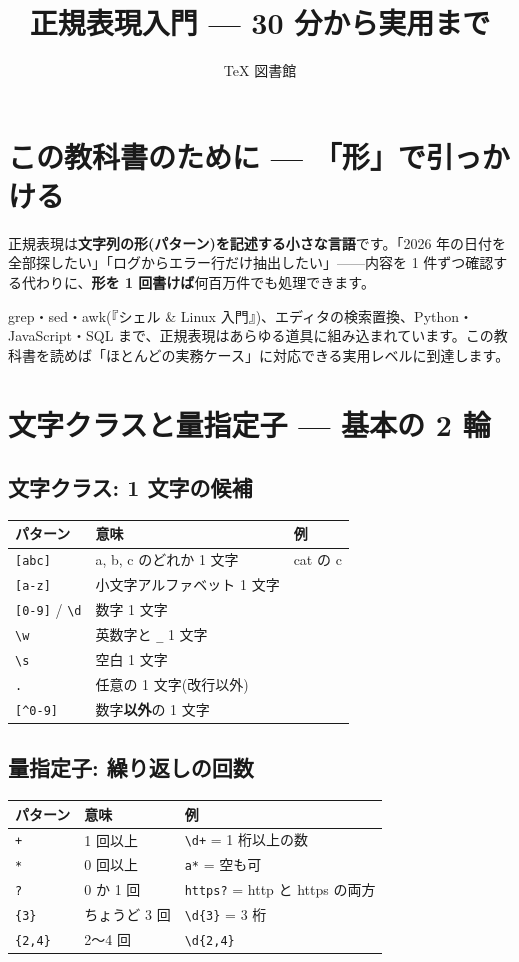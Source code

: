 \documentclass{article}
\title{正規表現入門 — 30 分から実用まで}
\author{TeX 図書館}
\begin{document}
\section{この教科書のために — 「形」で引っかける}

正規表現は\textbf{文字列の形(パターン)を記述する小さな言語}です。「2026 年の日付を全部探したい」「ログからエラー行だけ抽出したい」——内容を 1 件ずつ確認する代わりに、\textbf{形を 1 回書けば}何百万件でも処理できます。

grep・sed・awk(『シェル \& Linux 入門』)、エディタの検索置換、Python・JavaScript・SQL まで、正規表現はあらゆる道具に組み込まれています。この教科書を読めば「ほとんどの実務ケース」に対応できる実用レベルに到達します。

\section{文字クラスと量指定子 — 基本の 2 輪}

\subsection{文字クラス: 1 文字の候補}

\begin{center}
\begin{tabular}{|l|l|l|}
\hline
パターン & 意味 & 例 \\
\hline
\texttt{[abc]} & a, b, c のどれか 1 文字 & cat の c \\
\texttt{[a-z]} & 小文字アルファベット 1 文字 & \\
\texttt{[0-9]} / \texttt{\textbackslash d} & 数字 1 文字 & \\
\texttt{\textbackslash w} & 英数字と \texttt{\_} 1 文字 & \\
\texttt{\textbackslash s} & 空白 1 文字 & \\
\texttt{.} & 任意の 1 文字(改行以外) & \\
\texttt{[\^{}0-9]} & 数字\textbf{以外}の 1 文字 & \\
\hline
\end{tabular}
\end{center}

\subsection{量指定子: 繰り返しの回数}

\begin{center}
\begin{tabular}{|l|l|l|}
\hline
パターン & 意味 & 例 \\
\hline
\texttt{+} & 1 回以上 & \texttt{\textbackslash d+} = 1 桁以上の数 \\
\texttt{*} & 0 回以上 & \texttt{a*} = 空も可 \\
\texttt{?} & 0 か 1 回 & \texttt{https?} = http と https の両方 \\
\texttt{\{3\}} & ちょうど 3 回 & \texttt{\textbackslash d\{3\}} = 3 桁 \\
\texttt{\{2,4\}} & 2〜4 回 & \texttt{\textbackslash d\{2,4\}} \\
\hline
\end{tabular}
\end{center}
\end{document}
